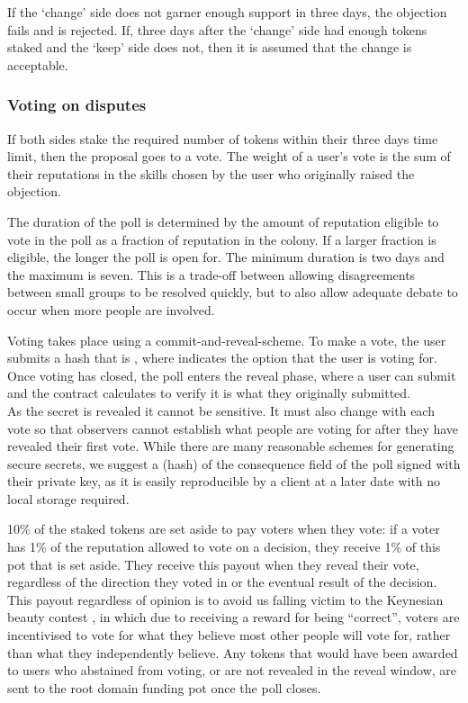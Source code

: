 If the `change' side does not garner enough support in three days, the objection fails and is rejected. If, three days after the `change' side had enough tokens staked and the `keep' side does not, then it is assumed that the change is acceptable.

\subsubsection*{Voting on disputes}

If both sides stake the required number of tokens within their three days time limit, then the proposal goes to a vote. The weight of a user's vote is the sum of their reputations in the skills chosen by the user who originally raised the objection.

The duration of the poll is determined by the amount of reputation eligible to vote in the poll as a fraction of reputation in the colony. If a larger fraction is eligible, the longer the poll is open for. The minimum duration is two days and the maximum is seven. This is a trade-off between allowing disagreements between small groups to be resolved quickly, but to also allow adequate debate to occur when more people are involved.

Voting takes place using a commit-and-reveal-scheme. To make a vote, the user submits a hash that is , where  indicates the option that the user is voting for. Once voting has closed, the poll enters the reveal phase, where a user can submit  and the contract calculates  to verify it is what they originally submitted. \\

As the secret is revealed it cannot be sensitive. It must also change with each vote so that observers cannot establish what people are voting for after they have revealed their first vote. While there are many reasonable schemes for generating secure secrets, we suggest a (hash) of the consequence field of the poll signed with their private key, as it is easily reproducible by a client at a later date with no local storage required.

10\% of the staked tokens are set aside to pay voters when they vote: if a voter has 1\% of the reputation allowed to vote on a decision, they receive 1\% of this pot that is set aside. They receive this payout when they reveal their vote, regardless of the direction they voted in or the eventual result of the decision. This payout regardless of opinion is to avoid us falling victim to the Keynesian beauty contest \cite{KeynesianBeauty}, in which due to receiving a reward for being “correct”, voters are incentivised to vote for what they believe most other people will vote for, rather than what they independently believe. Any tokens that would have been awarded to users who abstained from voting, or are not revealed in the reveal window, are sent to the root domain funding pot once the poll closes.

